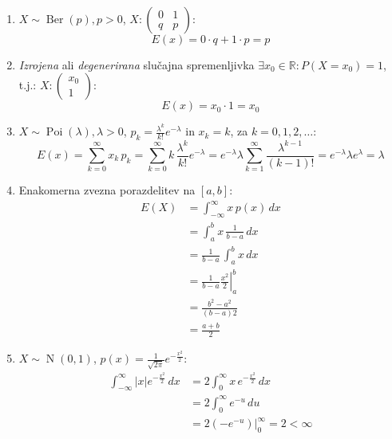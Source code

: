 \documentclass[12pt]{book}
\theoremstyle{definition}
\theoremstyle{plain}
\theoremstyle{plain}
\theoremstyle{plain}
\theoremstyle{remark}
\begin{document}
\begin{zgled}
    ~
    
    \begin{enumerate}
        \item $X \sim \operatorname{Ber}(p), p >0$, $X:\left(\begin{array}{cc} 0 & 1 \\ q & p \end{array}\right)$:
        $$
        E(x)=0 \cdot q+1 \cdot p=p
        $$
        \item \emph{Izrojena} ali \emph{degenerirana} slučajna spremenljivka $\exists x_0 \in \mathbb{R}: P\left(X=x_0\right)=1$, t.j.: $X:\left(\begin{array}{c} x_0 \\ 1 \end{array}\right)$:
        $$
        E(x)=x_0 \cdot 1=x_0
        $$
        \item $X \sim \operatorname{Poi}(\lambda), \lambda >0$, $p_k=\frac{\lambda^k}{k !}  e^{-\lambda}$ in $x_k = k$, za $k=0, 1, 2, \ldots$:
        $$
        E(x)=\sum_{k=0}^{\infty} x_k \, p_k=\sum_{k=0}^{\infty} k \, \frac{\lambda^k}{k !}  e^{-\lambda}=e^{-\lambda} \lambda \sum_{k=1}^{\infty} \frac{\lambda^{k-1}}{(k-1) !} = e^{-\lambda} \lambda e^\lambda=\lambda
        $$
        \item Enakomerna zvezna porazdelitev na $[a, b]$:
        $$
        \begin{aligned}
            E(X)&=\int_{-\infty}^{\infty} x \, p(x) \, d x \\
            &=\int_a^b x \, \frac{1}{b-a} \, d x \\
            &=\frac{1}{b-a} \, \int_a^b x \,d x \\
            &=\left.\frac{1}{b-a} \frac{x^2}{2}\right|_a ^b \\
            &=\frac{b^2-a^2}{(b-a) 2} \\
            &=\frac{a+b}{2}
        \end{aligned}
        $$
        \item $X \sim \operatorname{N}(0,1)$, $p(x)=\frac{1}{\sqrt{2 \pi}} e^{-\frac{x^2}{2}}$:
        \begin{align*}
            \int_{-\infty}^{\infty}|x| e^{-\frac{x^2}{2}} \, d x&=2 \int_0^{\infty} x \, e^{-\frac{x^2}{2}} \, d x \\
            &=2 \int_0^{\infty} e^{-u} \, d u \tag{$\star$} \\
            &=\left.2 \left(-e^{-u}\right)\right|_0 ^{\infty}=2<\infty
        \end{align*}

\end{enumerate}
\end{zgled}
\end{document}
